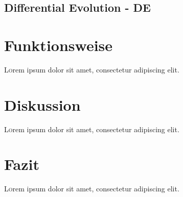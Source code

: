 \documentclass[twoside,twocolumn]{article}
\begin{document}
\subsection{Differential Evolution - DE}
\blindtext %


\section{Funktionsweise}

\lettrine[nindent=0em,lines=3]{L} orem ipsum dolor sit amet, consectetur adipiscing elit.
\blindtext %


\section{Diskussion}

\lettrine[nindent=0em,lines=3]{L} orem ipsum dolor sit amet, consectetur adipiscing elit.
\blindtext %


\section{Fazit}

\lettrine[nindent=0em,lines=3]{L} orem ipsum dolor sit amet, consectetur adipiscing elit.
\blindtext %


\renewcommand{\refname}{Quellenverzeichnis}




\end{document}
